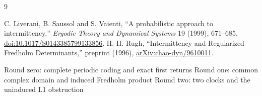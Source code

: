 \documentclass[10pt]{article}
\begin{document}
\begin{thebibliography}{9}
\raggedright
{} C. Liverani, B. Saussol and S. Vaienti,
``A probabilistic approach to intermittency,''
\emph{Ergodic Theory and Dynamical Systems} 19 (1999), 671--685,
\href{https://doi.org/10.1017/S0143385799133856}{doi:10.1017/S0143385799133856}.
 H. H. Rugh, ``Intermittency and Regularized Fredholm
Determinants,'' preprint (1996),
\href{https://arxiv.org/abs/chao-dyn/9610011}{arXiv:chao-dyn/9610011}.
\end{thebibliography}
\bigskip
\begin{center}\small\sffamily
\ifcase\CRevisionRound
Round zero: complete periodic coding and exact first returns
\or
Round one: common complex domain and induced Fredholm product
\else
Round two: two clocks and the uninduced L1 obstruction
\fi
\end{center}
\end{document}
